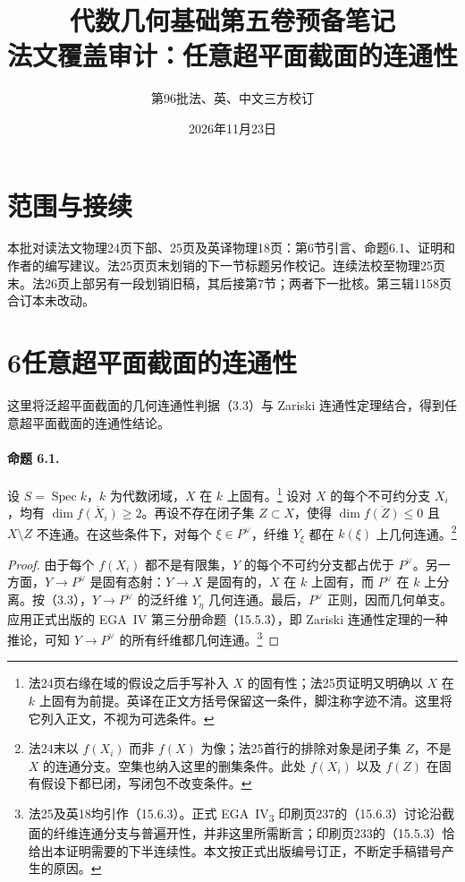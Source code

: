 \documentclass[openany,fontset=fandol]{ctexbook}
\DeclareMathOperator{\Spec}{Spec}
\begin{document}
\title{代数几何基础第五卷预备笔记\\法文覆盖审计：任意超平面截面的连通性}
\author{第96批\quad 法、英、中文三方校订}
\date{2026年11月23日}
\maketitle

\section*{范围与接续}
本批对读法文物理24页下部、25页及英译物理18页：第6节引言、命题6.1、证明和作者的编写建议。法25页页末划销的下一节标题另作校记。连续法校至物理25页末。法26页上部另有一段划销旧稿，其后接第7节；两者下一批核。第三辑1158页合订本未改动。

\section*{6\quad 任意超平面截面的连通性}
这里将泛超平面截面的几何连通性判据（3.3）与 Zariski 连通性定理结合，得到任意超平面截面的连通性结论。

\paragraph{命题 6.1.}
设 $S=\Spec k$，$k$ 为代数闭域，$X$ 在 $k$ 上固有。\footnote{法24页右缘在域的假设之后手写补入 $X$ 的固有性；法25页证明又明确以 $X$ 在 $k$ 上固有为前提。英译在正文方括号保留这一条件，脚注称字迹不清。这里将它列入正文，不视为可选条件。}
设对 $X$ 的每个不可约分支 $X_i$，均有 $\dim\overline{f(X_i)}\geq2$。再设不存在闭子集 $Z\subset X$，使得 $\dim\overline{f(Z)}\leq0$ 且 $X\setminus Z$ 不连通。在这些条件下，对每个 $\xi\in P^\vee$，纤维 $Y_\xi$ 都在 $k(\xi)$ 上几何连通。\footnote{法24末以 $f(X_i)$ 而非 $f(X)$ 为像；法25首行的排除对象是闭子集 $Z$，不是 $X$ 的连通分支。空集也纳入这里的删集条件。此处 $f(X_i)$ 以及 $f(Z)$ 在固有假设下都已闭，写闭包不改变条件。}

\begin{proof}
由于每个 $f(X_i)$ 都不是有限集，$Y$ 的每个不可约分支都占优于 $P^\vee$。另一方面，$Y\to P^\vee$ 是固有态射：$Y\to X$ 是固有的，$X$ 在 $k$ 上固有，而 $P^\vee$ 在 $k$ 上分离。按（3.3），$Y\to P^\vee$ 的泛纤维 $Y_\eta$ 几何连通。最后，$P^\vee$ 正则，因而几何单支。应用正式出版的 EGA~IV 第三分册命题（15.5.3），即 Zariski 连通性定理的一种推论，可知 $Y\to P^\vee$ 的所有纤维都几何连通。\footnote{法25及英18均引作（15.6.3）。正式 EGA~IV\textsubscript{3} 印刷页237的（15.6.3）讨论沿截面的纤维连通分支与普遍开性，并非这里所需断言；印刷页233的（15.5.3）恰给出本证明需要的下半连续性。本文按正式出版编号订正，不断定手稿错号产生的原因。}
\end{proof}
\end{document}
